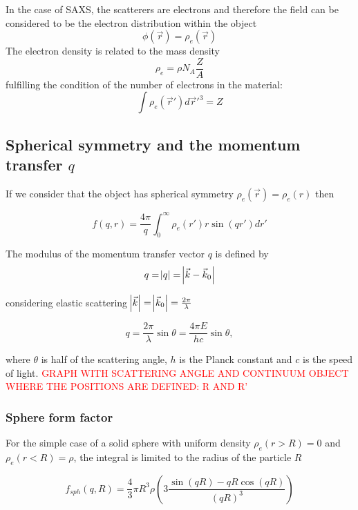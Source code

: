 In the case of SAXS, the scatterers are electrons and therefore the field can be considered to be the electron distribution within the object
\begin{equation}
       \phi(\vec{r})=\rho_e(\vec{r})
\end{equation}
The electron density is related to the mass density
\begin{equation}
        \rho_e = \rho N_A \frac{Z}{A}
\end{equation}
fulfilling the condition of the number of electrons in the material:
\begin{equation}
        \int \rho_e(\vec{r}')  d\vec{r}'^3 = Z
\end{equation}

\subsection{Spherical symmetry and the momentum transfer $q$}

If we consider that the object has spherical symmetry $\rho_e(\vec{r})=\rho_e(r)$ then

\begin{equation}
       f(q,r)=\frac{4\pi}{q} \int_0^{\infty} \rho_e(r') r \sin(qr')  dr'
\end{equation}

The modulus of the momentum transfer vector $q$ is defined by
\begin{equation}
       q=\abs{q}=\abs{\vec{k} - \vec{k}_0}
\end{equation}

considering elastic scattering $\abs{\vec{k}}=\abs{\vec{k}_0}=\frac{2\pi}{\lambda}$

\begin{equation}
q=\frac{2\pi }{\lambda}\sin\theta=\frac{4\pi E}{h c}\sin\theta ,
\end{equation}

where \(\theta\) is half of the scattering angle, \(h\) is the Planck constant and \(c\) is the speed of light. \textcolor{red}{GRAPH WITH SCATTERING ANGLE AND CONTINUUM OBJECT WHERE THE POSITIONS ARE DEFINED: R AND R'}
\subsubsection{Sphere form factor}
For the simple case of a solid sphere with uniform density $\rho_e(r>R)=0$ and $\rho_e(r<R)=\rho$, the integral is limited to the radius of the particle $R$

\begin{equation}
       f_{sph}(q,R)=\frac{4}{3}\pi R^3 \rho \left( 3\frac{\sin(qR)-qR\cos(qR)}{\left( qR \right)^3} \right)
\end{equation}

